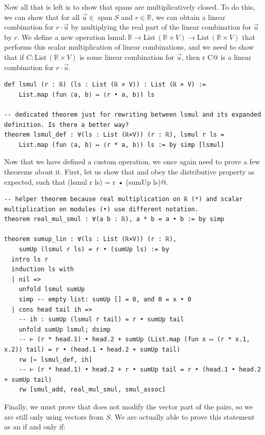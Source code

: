 \documentclass{article}
\DeclareMathOperator{\spann}{span}
\begin{document}
Now all that is left is to show that spans are multiplicatively closed. To do this, we can show that for all $\vec{u} \in \spann S$ and $r \in \mathbb R$, we can obtain a linear combination for $r \cdot \vec u$ by multiplying the real part of the linear combination for $\vec{u}$ by $r$. We define a new operation $\text{lsmul} : \mathbb{R} \to \text{List}\,(\mathbb{R}\times V )\to \text{List}\,(\mathbb{R} \times V)$ that performs this scalar multiplication of linear combinations, and we need to show that if $C : \text{List}\,(\mathbb{R} \times V)$ is some linear combination for $\vec{u}$, then \lstinline@lsmul r C@ is a linear combination for $r \cdot \vec{u}$.

\begin{lstlisting}
def lsmul (r : ℝ) (ls : List (ℝ × V)) : List (ℝ × V) :=
    List.map (fun ⟨a, b⟩ ↦ ⟨r • a, b⟩) ls

-- dedicated theorem just for rewriting between lsmul and its expanded definition. Is there a better way?
theorem lsmul_def : ∀(ls : List (ℝ×V)) (r : ℝ), lsmul r ls =
    List.map (fun ⟨a, b⟩ ↦ ⟨r * a, b⟩) ls := by simp [lsmul]
\end{lstlisting}

Now that we have defined a custom operation, we once again need to prove a few theorems about it. First, let us show that \lstinline@sumUp@ and \lstinline@lsmul@ obey the distributive property as expected, such that \lstinline@sumUp (lsmul r ls) = r • (sumUp ls)@.

\begin{lstlisting}
-- helper theorem because real multiplication on ℝ (*) and scalar multiplication on modules (•) use different notation.
theorem real_mul_smul : ∀(a b : ℝ), a * b = a • b := by simp

theorem sumup_lin : ∀(ls : List (ℝ×V)) (r : ℝ),
    sumUp (lsmul r ls) = r • (sumUp ls) := by
  intro ls r
  induction ls with
  | nil =>
    unfold lsmul sumUp
    simp -- empty list: sumUp [] = 0, and 0 = x • 0
  | cons head tail ih =>
    -- ih : sumUp (lsmul r tail) = r • sumUp tail
    unfold sumUp lsmul; dsimp
    -- ⊢ (r * head.1) • head.2 + sumUp (List.map (fun x ↦ (r * x.1, x.2)) tail) = r • (head.1 • head.2 + sumUp tail)
    rw [← lsmul_def, ih]
    -- ⊢ (r * head.1) • head.2 + r • sumUp tail = r • (head.1 • head.2 + sumUp tail)
    rw [smul_add, real_mul_smul, smul_assoc]
\end{lstlisting}

Finally, we must prove that \lstinline@lsmul@ does not modify the vector part of the pairs, so we are still only using vectors from $S$. We are actually able to prove this statement as an if and only if:
\end{document}
